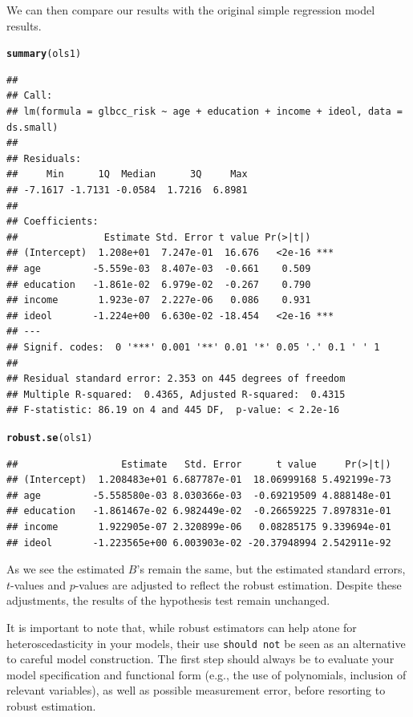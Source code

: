\documentclass[11pt,openany]{book}
\makeatletter
\newcommand{\hlstd}[1]{\textcolor[rgb]{0.345,0.345,0.345}{#1}}%
\newcommand{\hlkwd}[1]{\textcolor[rgb]{0.737,0.353,0.396}{\textbf{#1}}}%
\newenvironment{kframe}{%
 \def\at@end@of@kframe{}%
 \ifinner\ifhmode%
  \def\at@end@of@kframe{\end{minipage}}%
  \begin{minipage}{\columnwidth}%
 \fi\fi%
 \def\FrameCommand##1{\hskip\@totalleftmargin \hskip-\fboxsep
 \colorbox{shadecolor}{##1}\hskip-\fboxsep
     \hskip-\linewidth \hskip-\@totalleftmargin \hskip\columnwidth}%
 \MakeFramed {\advance\hsize-\width
   \@totalleftmargin\z@ \linewidth\hsize
   \@setminipage}}%
 {\par\unskip\endMakeFramed%
 \at@end@of@kframe}
\newenvironment{knitrout}{}{} %
\renewenvironment{knitrout}{\begin{singlespace}}{\end{singlespace}}
\makeatother
\begin{document}
We can then compare our results with the original simple regression model results. 
\begin{knitrout}
\color{fgcolor}\begin{kframe}
\begin{alltt}
\hlkwd{summary}\hlstd{(ols1)}
\end{alltt}
\begin{verbatim}
## 
## Call:
## lm(formula = glbcc_risk ~ age + education + income + ideol, data = ds.small)
## 
## Residuals:
##     Min      1Q  Median      3Q     Max 
## -7.1617 -1.7131 -0.0584  1.7216  6.8981 
## 
## Coefficients:
##               Estimate Std. Error t value Pr(>|t|)    
## (Intercept)  1.208e+01  7.247e-01  16.676   <2e-16 ***
## age         -5.559e-03  8.407e-03  -0.661    0.509    
## education   -1.861e-02  6.979e-02  -0.267    0.790    
## income       1.923e-07  2.227e-06   0.086    0.931    
## ideol       -1.224e+00  6.630e-02 -18.454   <2e-16 ***
## ---
## Signif. codes:  0 '***' 0.001 '**' 0.01 '*' 0.05 '.' 0.1 ' ' 1
## 
## Residual standard error: 2.353 on 445 degrees of freedom
## Multiple R-squared:  0.4365,	Adjusted R-squared:  0.4315 
## F-statistic: 86.19 on 4 and 445 DF,  p-value: < 2.2e-16
\end{verbatim}
\begin{alltt}
\hlkwd{robust.se}\hlstd{(ols1)}
\end{alltt}
\begin{verbatim}
##                  Estimate   Std. Error      t value     Pr(>|t|)
## (Intercept)  1.208483e+01 6.687787e-01  18.06999168 5.492199e-73
## age         -5.558580e-03 8.030366e-03  -0.69219509 4.888148e-01
## education   -1.861467e-02 6.982449e-02  -0.26659225 7.897831e-01
## income       1.922905e-07 2.320899e-06   0.08285175 9.339694e-01
## ideol       -1.223565e+00 6.003903e-02 -20.37948994 2.542911e-92
\end{verbatim}
\end{kframe}
\end{knitrout}
\noindent As we see the estimated $B$'s remain the same, but the estimated standard errors, $t$-values and $p$-values are adjusted to reflect the robust estimation. Despite these adjustments, the results of the hypothesis test remain unchanged.

It is important to note that, while robust estimators can help atone for heteroscedasticity in your models, their use \texttt{should not} be seen as an alternative to careful model construction. The first step should always be to evaluate your model specification and functional form (e.g., the use of polynomials, inclusion of relevant variables), as well as possible measurement error, before resorting to robust estimation.
\end{document}
